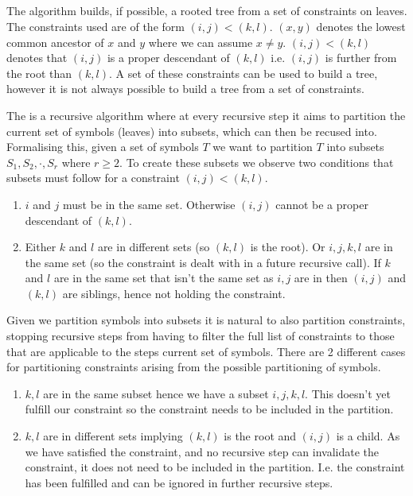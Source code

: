 \subsection{}
The  algorithm builds, if possible, a rooted tree from a set of constraints on leaves.
The constraints used are of the form $(i,j)<(k,l)$. $(x,y)$ denotes the lowest common ancestor of $x$ and $y$ where we can assume $x \neq y$. $(i,j)<(k,l)$ denotes that $(i,j)$ is a proper descendant of $(k,l)$ i.e. $(i,j)$ is further from the root than $(k,l)$.
A set of these constraints can be used to build a tree, however it is not always possible to build a tree from a set of constraints.

The  is a recursive algorithm where at every recursive step it aims to partition the current set of symbols (leaves) into subsets, which can then be  recused  into.
Formalising this, given a set of symbols $T$ we want to partition $T$ into subsets $S_1, S_2, \cdot, S_r$ where $r \geq 2$. To create these subsets we observe two conditions that subsets must follow for a constraint $(i,j)<(k,l)$.
\begin{enumerate}
\item $i$ and $j$ must be in the same set.
Otherwise $(i, j)$ cannot be a proper descendant of $(k,l)$.
\item Either $k$ and $l$ are in different sets (so $(k,l)$ is the root). 
Or $i,j,k,l$ are in the same set (so the constraint is dealt with in a future recursive call).
If $k$ and $l$ are in the same set that isn't the same set as $i,j$ are in then $(i,j)$ and $(k,l)$ are siblings, hence not holding the constraint.
\end{enumerate}


Given we partition symbols into subsets it is natural to also partition constraints, stopping recursive steps from having to filter the full list of constraints to those that are applicable to the steps current set of symbols.
There are 2 different cases for partitioning constraints arising from the possible partitioning of symbols.
\begin{enumerate}
\item $k,l$ are in the same subset hence we have a subset $i,j,k,l$. 
This doesn't yet fulfill our constraint so the constraint needs to be included in the partition.
\item $k,l$ are in different sets implying $(k,l)$ is the root and $(i,j)$ is a child.
As we have satisfied the constraint, and no recursive step can invalidate the constraint, it does not need to be included in the partition. I.e. the constraint has been fulfilled and can be ignored in further recursive steps.
\end{enumerate}

